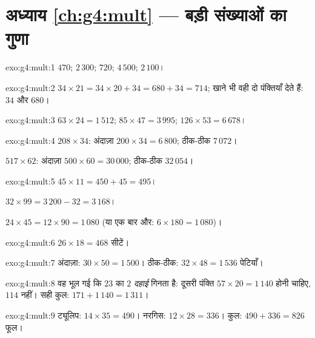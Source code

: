 \section*{अध्याय \ref{ch:g4:mult} --- बड़ी संख्याओं का गुणा}

\begin{solution}{exo:g4:mult:1}
$470$; \quad $2\,300$; \quad $720$; \quad $4\,500$; \quad
$2\,100$।
\end{solution}

\begin{solution}{exo:g4:mult:2}
$34 \times 21 = 34 \times 20 + 34 = 680 + 34 = 714$; खाने भी
वही दो पंक्तियाँ देते हैं: $34$ और $680$।
\end{solution}

\begin{solution}{exo:g4:mult:3}
$63 \times 24 = 1\,512$; \quad
$85 \times 47 = 3\,995$; \quad
$126 \times 53 = 6\,678$।
\end{solution}

\begin{solution}{exo:g4:mult:4}
$208 \times 34$: अंदाज़ा $200 \times 34 = 6\,800$; ठीक-ठीक
$7\,072$।

$517 \times 62$: अंदाज़ा $500 \times 60 = 30\,000$; ठीक-ठीक
$32\,054$।
\end{solution}

\begin{solution}{exo:g4:mult:5}
$45 \times 11 = 450 + 45 = 495$।

$32 \times 99 = 3\,200 - 32 = 3\,168$।

$24 \times 45 = 12 \times 90 = 1\,080$ (या एक बार और:
$6 \times 180 = 1\,080$)।
\end{solution}

\begin{solution}{exo:g4:mult:6}
$26 \times 18 = 468$ सीटें।
\end{solution}

\begin{solution}{exo:g4:mult:7}
अंदाज़ा: $30 \times 50 = 1\,500$। ठीक-ठीक:
$32 \times 48 = 1\,536$ पेटियाँ।
\end{solution}

\begin{solution}{exo:g4:mult:8}
वह भूल गई कि $23$ का $2$ \emph{दहाई} गिनता है: दूसरी पंक्ति
$57 \times 20 = 1\,140$ होनी चाहिए, $114$ नहीं। सही कुल:
$171 + 1\,140 = 1\,311$।
\end{solution}

\begin{solution}{exo:g4:mult:9}
ट्यूलिप: $14 \times 35 = 490$। नरगिस: $12 \times 28 = 336$।
कुल: $490 + 336 = 826$ फूल।
\end{solution}

